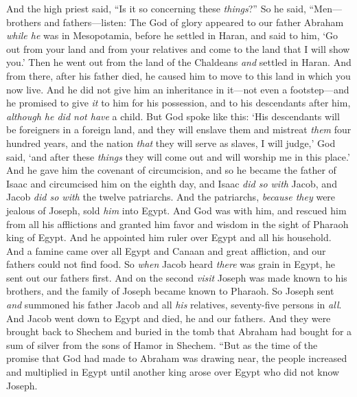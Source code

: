 \begin{biblechapter} %
 And the high priest said, “Is it so concerning these \textit{things}?”
\verse So he said, “Men—brothers and fathers—listen: The God of glory appeared to our father Abraham \textit{while he} was in Mesopotamia, before he settled in Haran,
\verse and said to him, ‘Go out from your land and from your relatives and come to the land that I will show you.’
\verse Then he went out from the land of the Chaldeans \textit{and} settled in Haran. And from there, after his father died, he caused him to move to this land in which you now live.
\verse And he did not give him an inheritance in it—not even a footstep—and he promised to give \textit{it} to him for his possession, and to his descendants after him, \textit{although he did not have} a child.
\verse But God spoke like this: ‘His descendants will be foreigners in a foreign land, and they will enslave them and mistreat \textit{them} four hundred years,
\verse and the nation \textit{that} they will serve as slaves, I will judge,’ God said, ‘and after these \textit{things} they will come out and will worship me in this place.’
\verse And he gave him the covenant of circumcision, and so he became the father of Isaac and circumcised him on the eighth day, and Isaac \textit{did so with} Jacob, and Jacob \textit{did so with} the twelve patriarchs.
\verse And the patriarchs, \textit{because they} were jealous of Joseph, sold \textit{him} into Egypt. And God was with him,
\verse and rescued him from all his afflictions and granted him favor and wisdom in the sight of Pharaoh king of Egypt. And he appointed him ruler over Egypt and all his household.
\verse And a famine came over all Egypt and Canaan and great affliction, and our fathers could not find food.
\verse So \textit{when} Jacob heard \textit{there} was grain in Egypt, he sent out our fathers first.
\verse And on the second \textit{visit} Joseph was made known to his brothers, and the family of Joseph became known to Pharaoh.
\verse So Joseph sent \textit{and} summoned his father Jacob and all \textit{his} relatives, seventy-five persons in \textit{all}.
\verse And Jacob went down to Egypt and died, he and our fathers.
\verse And they were brought back to Shechem and buried in the tomb that Abraham had bought for a sum of silver from the sons of Hamor in Shechem.
\verse “But as the time of the promise that God had made to Abraham was drawing near, the people increased and multiplied in Egypt
\verse until another king arose over Egypt who did not know Joseph.

\end{biblechapter}
